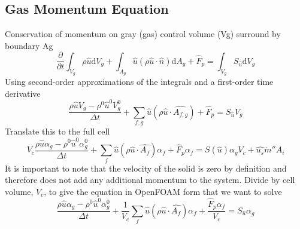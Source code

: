 \documentclass{article}
\renewcommand{\vec}[1]{\ensuremath{\hat{#1}}}
\renewcommand{\d}{\mathrm{d}}
\begin{document}
  \subsection{Gas Momentum Equation}
    Conservation of momentum on gray (gas) control volume (Vg) surround by boundary Ag
    \begin{equation*}
        \frac{\partial}{\partial t}\int_{V_g} \rho \vec{u} \d V_g
      + \int_{A_g} \vec{u} (\rho \vec{u} \cdot \vec{n}) \d A_g
      + \vec{F}_p
      = \int_{V_g} S_{\vec{u}} \d V_g
    \end{equation*}
    Using second-order approximations of the integrals and a first-order time derivative
    \begin{equation*}
        \frac{\rho \vec{u} V_g - \rho^0 \vec{u}^0 V_g^0}{\Delta t}
      + \sum_{f,g}\vec{u} (\rho \vec{u}\cdot\vec{A_{f,g}}) 
      + \vec{F}_p
      = S_{\vec{u}} V_g
    \end{equation*}
    Translate this to the full cell
    \begin{equation*}
        V_c\frac{\rho \vec{u} \alpha_g - \rho^0 \vec{u}^0 \alpha_g^0}{\Delta t}
      + \sum_{f}\vec{u} (\rho \vec{u}\cdot\vec{A_{f}})\alpha_f 
      + \vec{F}_p \alpha_f
      = S(\vec{u}) \alpha_g V_c
      + \vec{u_s} \dot{m}'' A_i
    \end{equation*}
    It is important to note that the velocity of the solid is zero by definition and therefore does not add any additional momentum to the system.
    Divide by cell volume, $V_c$, to give the equation in OpenFOAM form that we want to solve
    \begin{equation}
      \label{eq:gasMom}
      \boxed{
        \frac{\rho \vec{u} \alpha_g - \rho^0 \vec{u}^0 \alpha_g^0}{\Delta t}
      + \frac{1}{V_c}\sum_{f} \vec{u} (\rho \vec{u}\cdot\vec{A_{f}})\alpha_f
      + \frac{\vec{F}_p \alpha_f}{V_c}
      = S_{\vec{u}} \alpha_g
      }
    \end{equation}
\end{document}
